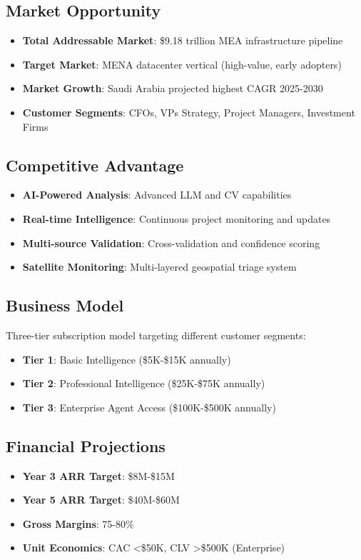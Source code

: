 \documentclass[executive]{../templates/infraradar-main}
\begin{document}
\subsection*{Market Opportunity}
\begin{itemize}
    \item \textbf{Total Addressable Market}: \$9.18 trillion MEA infrastructure pipeline
    \item \textbf{Target Market}: MENA datacenter vertical (high-value, early adopters)
    \item \textbf{Market Growth}: Saudi Arabia projected highest CAGR 2025-2030
    \item \textbf{Customer Segments}: CFOs, VPs Strategy, Project Managers, Investment Firms
\end{itemize}

\subsection*{Competitive Advantage}
\begin{itemize}
    \item \textbf{AI-Powered Analysis}: Advanced LLM and CV capabilities
    \item \textbf{Real-time Intelligence}: Continuous project monitoring and updates
    \item \textbf{Multi-source Validation}: Cross-validation and confidence scoring
    \item \textbf{Satellite Monitoring}: Multi-layered geospatial triage system
\end{itemize}

\subsection*{Business Model}
Three-tier subscription model targeting different customer segments:
\begin{itemize}
    \item \textbf{Tier 1}: Basic Intelligence (\$5K-\$15K annually)
    \item \textbf{Tier 2}: Professional Intelligence (\$25K-\$75K annually)
    \item \textbf{Tier 3}: Enterprise Agent Access (\$100K-\$500K annually)
\end{itemize}

\subsection*{Financial Projections}
\begin{itemize}
    \item \textbf{Year 3 ARR Target}: \$8M-\$15M
    \item \textbf{Year 5 ARR Target}: \$40M-\$60M
    \item \textbf{Gross Margins}: 75-80\%
    \item \textbf{Unit Economics}: CAC <\$50K, CLV >\$500K (Enterprise)
\end{itemize}
\end{document}
